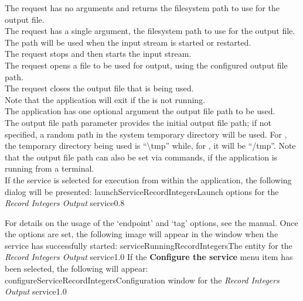 The  request has no arguments and
returns the file\longDash{}system path to use for the output file.\\

The  request has a single argument,
the file\longDash{}system path to use for the output file.
The path will be used when the input stream is started or restarted.\\

The  request stops and then
starts the input stream.\\

The  request opens a file to be
used for output, using the configured output file path.\\

The  request closes the output
file that is being used.\\

Note that the application will exit if the  is not
running.\\

The application has one optional argument \longDash{} the output file path to be used.
\insertAppParameters
{}
\insertOutputServiceComment\\

The output file path parameter provides the initial output file path; if not specified, a
random path in the system temporary directory will be used.
For \win, the temporary directory being used is ``\textbackslash{}tmp'' while, for \osx{},
it will be ``/tmp''.
Note that the output file path can also be set via commands, if the application is
running from a terminal.\\

\insertStandardServiceCommands
\condPage{}
If the service is selected for execution from within the \emph{\MMMU} application, the
following dialog will be presented:
%
{launchServiceRecordIntegers}{Launch options for the \emph{Record Integers Output}
service}{0.8}

For details on the usage of the `endpoint' and `tag' options, see the \emph{\MMMU} manual.
Once the options are set, the following image will appear in the \emph{\MMMU} window when
the service has successfully started:
%
{serviceRunningRecordIntegers}{The \emph{\MMMU} entity for the \emph{Record Integers
Output} service}{1.0}
\condPage{}
If the \textbf{Configure the service} menu item has been selected, the following will
appear:
%
{configureServiceRecordIntegers}{Configuration window for the \emph{Record Integers
Output} service}{1.0}

